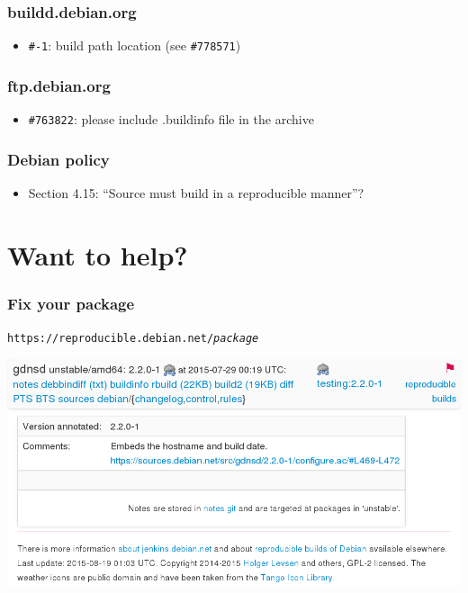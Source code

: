 \documentclass[14pt]{beamer}
\begin{document}
\begin{frame}
 \frametitle{buildd.debian.org}

 \begin{itemize}\small
  \item \texttt{\#-1}: build path location (see \texttt{\#778571})
 \end{itemize}
\end{frame}

\begin{frame}
 \frametitle{ftp.debian.org}

 \begin{itemize}\small
  \item \texttt{\#763822}: please include .buildinfo file in the archive
 \end{itemize}
\end{frame}


\begin{frame}
 \frametitle{Debian policy}

 \begin{itemize}
  \item Section 4.15: “Source must build in a reproducible manner”? 
 \end{itemize}
\end{frame}

\section{Want to help?}

\begin{frame}
 \frametitle{Fix your package}

 \begin{center}
  \texttt{https://reproducible.debian.net/\textit{package}}

  \includegraphics[width=\linewidth]{images/rdn-gdnsd.png}
 \end{center}
\end{frame}
\end{document}
